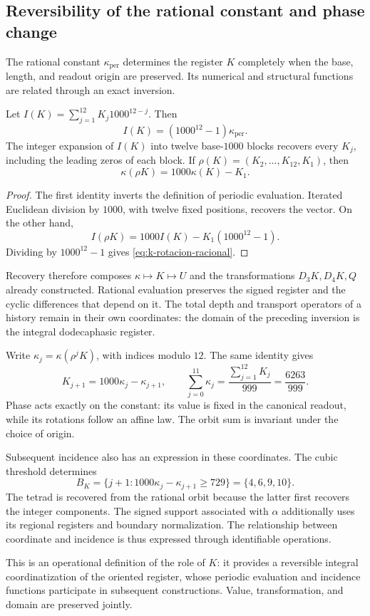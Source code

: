 \subsection{Reversibility of the rational constant and phase change}

The rational constant \(\kappa_{\mathrm{per}}\) determines the
register \(K\) completely when the base, length, and readout origin
are preserved. Its numerical and structural functions are related
through an exact inversion.

\begin{proposition}
Let \(I(K)=\sum_{j=1}^{12}K_j1000^{12-j}\). Then
\[
 I(K)=(1000^{12}-1)\kappa_{\mathrm{per}}.
\]
The integer expansion of \(I(K)\) into twelve base-\(1000\) blocks
recovers every \(K_j\), including the leading zeros of each block.
If \(\rho(K)=(K_2,\ldots,K_{12},K_1)\), then
\begin{equation}
 \kappa(\rho K)=1000\kappa(K)-K_1.
 \label{eq:k-rotacion-racional}
\end{equation}
\end{proposition}
\begin{proof}
The first identity inverts the definition of periodic evaluation.
Iterated Euclidean division by \(1000\), with twelve fixed positions,
recovers the vector. On the other hand,
\[
 I(\rho K)=1000I(K)-K_1(1000^{12}-1).
\]
Dividing by \(1000^{12}-1\) gives \eqref{eq:k-rotacion-racional}.
\end{proof}

Recovery therefore composes \(\kappa\mapsto K\mapsto U\)
and the transformations \(D_3K,D_4K,Q\) already constructed. Rational
evaluation preserves the signed register and the cyclic differences that
depend on it. The total depth and transport operators of
a history remain in their own coordinates: the domain of the preceding
inversion is the integral dodecaphasic register.

Write \(\kappa_j=\kappa(\rho^jK)\), with indices modulo \(12\).
The same identity gives
\[
 K_{j+1}=1000\kappa_j-\kappa_{j+1},\qquad
 \sum_{j=0}^{11}\kappa_j=\frac{\sum_{j=1}^{12}K_j}{999}
 =\frac{6263}{999}.
\]
Phase acts exactly on the constant: its value is fixed
in the canonical readout, while its rotations follow an affine law.
The orbit sum is invariant under the choice of origin.

Subsequent incidence also has an expression in these
coordinates. The cubic threshold determines
\[
 B_K=\{j+1:1000\kappa_j-\kappa_{j+1}\ge729\}
 =\{4,6,9,10\}.
\]
The tetrad is recovered from the rational orbit because the latter
first recovers the integer components. The signed support associated
with \(\alpha\) additionally uses its regional registers and boundary
normalization. The relationship between coordinate and incidence is thus
expressed through identifiable operations.

This is an operational definition of the role of \(K\): it provides
a reversible integral coordinatization of the oriented register, whose
periodic evaluation and incidence functions participate in
subsequent constructions. Value, transformation, and domain
are preserved jointly.
